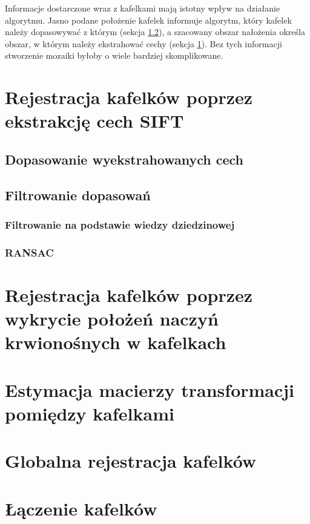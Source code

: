 Informacje dostarczone wraz z kafelkami mają istotny wpływ na działanie algorytmu. Jasno podane położenie kafelek informuje algorytm, który kafelek należy dopasowywać z którym (sekcja \ref{sec:proponowane_algorytmy:filtrowanie}), a szacowany obszar nałożenia określa obszar, w którym należy ekstrahować cechy (sekcja \ref{sec:proponowane_algorytmy:sift}). Bez tych informacji stworzenie mozaiki byłoby o wiele bardziej skomplikowane.

\section{Rejestracja kafelków poprzez ekstrakcję cech SIFT}
\label{sec:proponowane_algorytmy:sift}

\subsection{Dopasowanie wyekstrahowanych cech}
\label{sec:proponowane_algorytmy:filtrowanie}

\subsection{Filtrowanie dopasowań}
\label{sec:proponowane_algorytmy:filtrowanie}

\subsubsection{Filtrowanie na podstawie wiedzy dziedzinowej}
\label{sec:proponowane_algorytmy:filtrowanie_dziedzinowe}

\subsubsection{RANSAC}
\label{sec:proponowane_algorytmy:ransac}

\section{Rejestracja kafelków poprzez wykrycie położeń naczyń krwionośnych w kafelkach}
\label{sec:proponowane_algorytmy:depth_first_search}

\section{Estymacja macierzy transformacji pomiędzy kafelkami}
\label{sec:proponowane_algorytmy:estymacja}

\section{Globalna rejestracja kafelków}
\label{sec:proponowane_algorytmy:globalna_rejestracja}

\section{Łączenie kafelków}
\label{sec:proponowane_algorytmy:laczenie_kafelkow}
